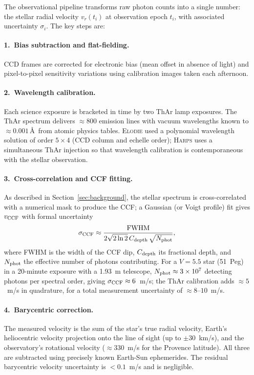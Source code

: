 \documentclass[12pt]{article}
\begin{document}
The observational pipeline transforms raw photon counts into a single
number: the stellar radial velocity $v_r(t_i)$ at observation epoch
$t_i$, with associated uncertainty $\sigma_i$.  The key steps are:

\paragraph{1.\ Bias subtraction and flat-fielding.}
CCD frames are corrected for electronic bias (mean offset in absence of
light) and pixel-to-pixel sensitivity variations using calibration images
taken each afternoon.

\paragraph{2.\ Wavelength calibration.}
Each science exposure is bracketed in time by two ThAr lamp exposures.
The ThAr spectrum delivers $\approx 800$ emission lines with vacuum
wavelengths known to $\approx 0.001$\,\AA\ from atomic physics tables.
\textsc{Elodie} used a polynomial wavelength solution of order $5\times4$
(CCD column and echelle order); \textsc{Harps} uses a simultaneous ThAr
injection so that wavelength calibration is contemporaneous with the
stellar observation.

\paragraph{3.\ Cross-correlation and CCF fitting.}
As described in Section~\ref{sec:background}, the stellar spectrum is
cross-correlated with a numerical mask to produce the CCF; a Gaussian
(or Voigt profile) fit gives $v_{\rm CCF}$ with formal uncertainty
\begin{equation}\label{eq:sigma_ccf}
  \sigma_{\rm CCF} \approx
  \frac{\text{FWHM}}{2\sqrt{2\ln 2}\,C_{\rm depth}\,\sqrt{N_{\rm phot}}},
\end{equation}
where FWHM is the width of the CCF dip, $C_{\rm depth}$ its fractional
depth, and $N_{\rm phot}$ the effective number of photons contributing.
For a $V=5.5$ star (51~Peg) in a 20-minute exposure with a 1.93~m
telescope, $N_{\rm phot} \approx 3\times10^7$ detecting photons per
spectral order, giving $\sigma_{\rm CCF} \approx 6$~m/s; the ThAr
calibration adds $\approx 5$~m/s in quadrature, for a total measurement
uncertainty of $\approx 8$--$10$~m/s.

\paragraph{4.\ Barycentric correction.}
The measured velocity is the sum of the star's true radial velocity,
Earth's heliocentric velocity projection onto the line of sight
(up to $\pm 30$~km/s), and the observatory's rotational velocity
($\approx 330$~m/s for the Provence latitude).  All three are subtracted
using precisely known Earth-Sun ephemerides.  The residual barycentric
velocity uncertainty is $< 0.1$~m/s and is negligible.
\end{document}
